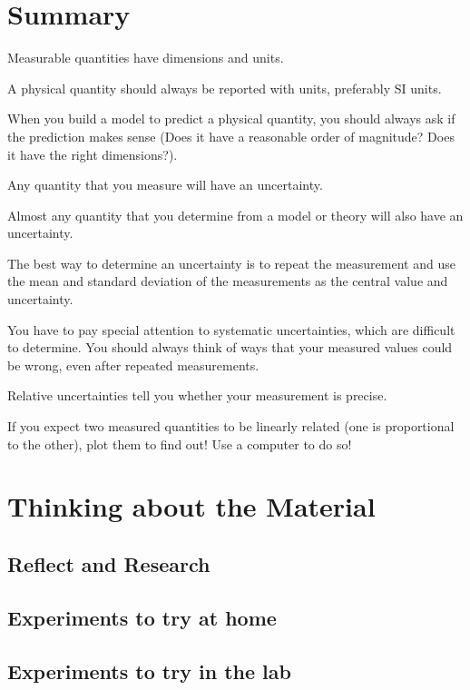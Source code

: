 \newpage
\section{Summary}
\vspace{2cm}
\begin{chapterSummary}
{
\item Measurable quantities have dimensions and units.
\item A physical quantity should always be reported with units, preferably SI units.
\item When you build a model to predict a physical quantity, you should always ask if the prediction makes sense (Does it have a reasonable order of magnitude? Does it have the right dimensions?).
\item Any quantity that you measure will have an uncertainty.
\item Almost any quantity that you determine from a model or theory will also have an uncertainty.
\item The best way to determine an uncertainty is to repeat the measurement and use the mean and standard deviation of the measurements as the central value and uncertainty.
\item You have to pay special attention to systematic uncertainties, which are difficult to determine. You should always think of ways that your measured values could be wrong, even after repeated measurements.
\item Relative uncertainties tell you whether your measurement is precise.
\item If you expect two measured quantities to be linearly related (one is proportional to the other), plot them to find out! Use a computer to do so!
}
\end{chapterSummary}

\section{Thinking about the Material}

\subsection{Reflect and Research}

\subsection{Experiments to try at home}

\subsection{Experiments to try in the lab}

